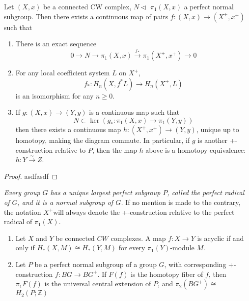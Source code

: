 \begin{theo}[Quillen]
Let $(X, x)$ be a connected CW complex, $N \triangleleft$ $\pi_1(X, x)$ a perfect normal subgroup. Then there exists a continuous map of pairs $f:(X, x) \longrightarrow\left(X^{+}, x^{+}\right)$ such that
\begin{enumerate}
    \item There is an exact sequence
    $$
    0 \longrightarrow N \longrightarrow \pi_1(X, x) \xrightarrow{f_*} \pi_1\left(X^{+}, x^{+}\right) \longrightarrow 0
    $$
    \item For any local coefficient system $L$ on $X^{+}$,
    $$
    f_*: H_n\left(X, f^* L\right) \longrightarrow H_n\left(X^{+}, L\right)
    $$
    is an isomorphism for any $n \geq 0$.
    \item If $g:(X, x) \longrightarrow(Y, y)$ is a continuous map such that
    $$
    N \subset \operatorname{ker}\left(g_*: \pi_1(X, x) \longrightarrow \pi_1(Y, y)\right)
    $$
    then there exists a continuous map $h:\left(X^{+}, x^{+}\right) \longrightarrow(Y, y)$, unique up to homotopy, making the diagram commute.
    In particular, if $g$ is another +-construction relative to $P$, then the map $h$ above is a homotopy equivalence: $h: Y \xrightarrow{\sim} Z$.
\end{enumerate}
\end{theo}
\begin{proof}
    asdfasdf
\end{proof}

\textit{Every group $G$ has a unique largest perfect subgroup $P$, called the perfect radical of $G$, and it is a normal subgroup of $G$. }If no mention is made to the contrary, the notation $X^{+}$will always denote the +-construction relative to the perfect radical of $\pi_1(X)$.

\begin{prop} %
    \begin{enumerate}
        \item Let $X$ and $Y$ be connected $C W$ complexes. A map $f: X \rightarrow Y$ is acyclic if and only if $H_*(X, M) \cong H_*(Y, M)$ for every $\pi_1(Y)$-module $M$.
        \item Let $P$ be a perfect normal subgroup of a group $G$, with corresponding +-construction $f: B G \rightarrow B G^{+}$. If $F(f)$ is the homotopy fiber of $f$, then $\pi_1 F(f)$ is the universal central extension of $P$, and $\pi_2\left(B G^{+}\right) \cong$ $H_2(P ; \mathbb{Z})$
    \end{enumerate}
\end{prop}






